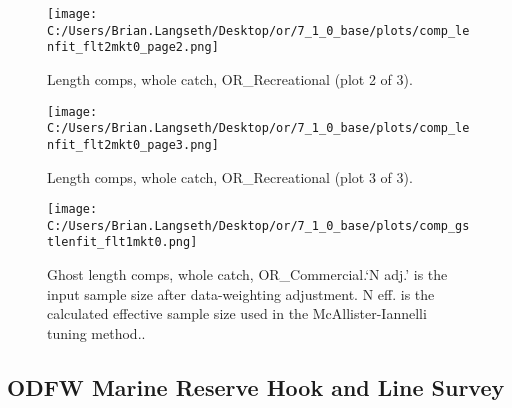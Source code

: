 \documentclass[11pt,
  english,
  a4paper,
]{article}
\begin{document}
\tagmcend\tagstructend


\begin{figure}
\centering
\texttt{[image: C:/Users/Brian.Langseth/Desktop/or/7\_1\_0\_base/plots/comp\_lenfit\_flt2mkt0\_page2.png]}
\caption{Length comps, whole catch, OR\_Recreational (plot 2 of 3).\label{fig:comp_lenfit_flt2mkt0_page2}}
\end{figure}

\tagmcend\tagstructend


\begin{figure}
\centering
\texttt{[image: C:/Users/Brian.Langseth/Desktop/or/7\_1\_0\_base/plots/comp\_lenfit\_flt2mkt0\_page3.png]}
\caption{Length comps, whole catch, OR\_Recreational (plot 3 of 3).\label{fig:comp_lenfit_flt2mkt0_page3}}
\end{figure}

\tagmcend\tagstructend


\begin{figure}
\centering
\texttt{[image: C:/Users/Brian.Langseth/Desktop/or/7\_1\_0\_base/plots/comp\_gstlenfit\_flt1mkt0.png]}
\caption{Ghost length comps, whole catch, OR\_Commercial.`N adj.' is the input sample size after data-weighting adjustment. N eff. is the calculated effective sample size used in the McAllister-Iannelli tuning method..\label{fig:comp_gstlenfit_flt1mkt0}}
\end{figure}

\tagmcend\tagstructend

\clearpage


\hypertarget{odfw-marine-reserve-hook-and-line-survey}{%
\subsection{ODFW Marine Reserve Hook and Line Survey}\label{odfw-marine-reserve-hook-and-line-survey}}
\end{document}
